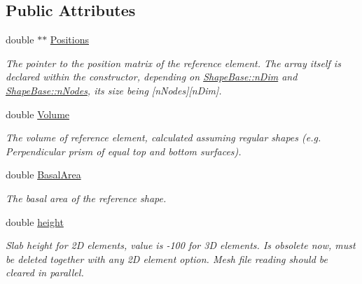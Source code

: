 \subsection*{Public Attributes}
\begin{DoxyCompactItemize}
\item 
\hypertarget{classReferenceShapeBase_a745e71ff73ef758708f39a4b3b1be4d1}{}double $\ast$$\ast$ \hyperlink{classReferenceShapeBase_a745e71ff73ef758708f39a4b3b1be4d1}{Positions}\label{classReferenceShapeBase_a745e71ff73ef758708f39a4b3b1be4d1}

\begin{DoxyCompactList}\small\item\em The pointer to the position matrix of the reference element. The array itself is declared within the constructor, depending on \hyperlink{classShapeBase_a250bd3396546342c8104f5b9c180d18f}{Shape\+Base\+::n\+Dim} and \hyperlink{classShapeBase_ae7dd93b58b3281ce90025f83d0f0e976}{Shape\+Base\+::n\+Nodes}, its size being \mbox{[}n\+Nodes\mbox{]}\mbox{[}n\+Dim\mbox{]}. \end{DoxyCompactList}\item 
\hypertarget{classReferenceShapeBase_a12d2d0c2511f4f1357360ff61910ac02}{}double \hyperlink{classReferenceShapeBase_a12d2d0c2511f4f1357360ff61910ac02}{Volume}\label{classReferenceShapeBase_a12d2d0c2511f4f1357360ff61910ac02}

\begin{DoxyCompactList}\small\item\em The volume of reference element, calculated assuming regular shapes (e.\+g. Perpendicular prism of equal top and bottom surfaces). \end{DoxyCompactList}\item 
\hypertarget{classReferenceShapeBase_a214b89b970efa7a290dbe1533cf237ea}{}double \hyperlink{classReferenceShapeBase_a214b89b970efa7a290dbe1533cf237ea}{Basal\+Area}\label{classReferenceShapeBase_a214b89b970efa7a290dbe1533cf237ea}

\begin{DoxyCompactList}\small\item\em The basal area of the reference shape. \end{DoxyCompactList}\item 
\hypertarget{classReferenceShapeBase_a76ac694d1b1276f6847bee3c3efa84b0}{}double \hyperlink{classReferenceShapeBase_a76ac694d1b1276f6847bee3c3efa84b0}{height}\label{classReferenceShapeBase_a76ac694d1b1276f6847bee3c3efa84b0}

\begin{DoxyCompactList}\small\item\em Slab height for 2\+D elements, value is -\/100 for 3\+D elements. Is obsolete now, must be deleted together with any 2\+D element option. Mesh file reading should be cleared in parallel. \end{DoxyCompactList}\end{DoxyCompactItemize}
